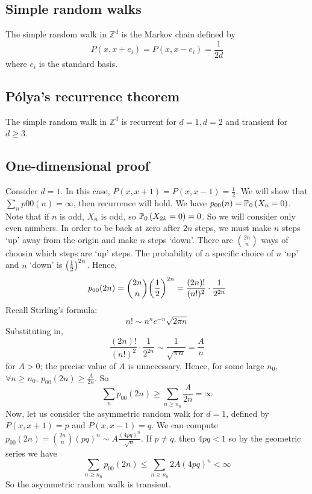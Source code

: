 \subsection{Simple random walks}
\begin{definition}
	The simple random walk in \( \mathbb Z^d \) is the Markov chain defined by
	\[
		P(x,x+e_i) = P(x,x-e_i) = \frac{1}{2d}
	\]
	where \( e_i \) is the standard basis.
\end{definition}

\subsection{P\'olya's recurrence theorem}
\begin{theorem}
	The simple random walk in \( \mathbb Z^d \) is recurrent for \( d = 1, d = 2 \) and transient for \( d \geq 3 \).
\end{theorem}

\subsection{One-dimensional proof}
Consider \( d = 1 \).
In this case, \( P(x,x+1) = P(x,x-1) = \frac{1}{2} \).
We will show that \( \sum_n p{00}(n) = \infty \), then recurrence will hold.
We have \( p_{00}(n) = \mathbb{P}_{0}\left({X_n = 0}\right) \).
Note that if \( n \) is odd, \( X_n \) is odd, so \( \mathbb{P}_{0}\left({X_{2k} = 0}\right) = 0 \).
So we will consider only even numbers.
In order to be back at zero after \( 2n \) steps, we must make \( n \) steps `up' away from the origin and make \( n \) steps `down'.
There are \( \binom{2n}{n} \) ways of choosin which steps are `up' steps.
The probability of a specific choice of \( n \) `up' and \( n \) `down' is \( \qty(\frac{1}{2})^{2n} \).
Hence,
\[
	p_{00}(2n) = \binom{2n}{n} \qty(\frac{1}{2})^{2n} = \frac{(2n)!}{(n!)^2} \cdot \frac{1}{2^{2n}}
\]
Recall Stirling's formula:
\[
	n!
	\sim n^n e^{-n} \sqrt{2 \pi n}
\]
Substituting in,
\[
	\frac{(2n)!}{(n!)^2} \cdot \frac{1}{2^{2n}} \sim \frac{1}{\sqrt{\pi n}} = \frac{A}{n}
\]
for \( A > 0 \); the precise value of \( A \) is unnecessary.
Hence, for some large \( n_0 \), \( \forall n \geq n_0 \), \( p_{00}(2n) \geq \frac{A}{2n} \).
So
\[
	\sum_n p_{00}(2n) \geq \sum_{n \geq n_0} \frac{A}{2n} = \infty
\]
Now, let us consider the asymmetric random walk for \( d = 1 \), defined by \( P(x,x+1) = p \) and \( P(x,x-1) = q \).
We can compute \( p_{00}(2n) = \binom{2n}{n} (pq)^n \sim A \frac{(4pq)^n}{\sqrt{n}} \).
If \( p \neq q \), then \( 4pq < 1 \) so by the geometric series we have
\[
	\sum_{n \geq n_0} p_{00}(2n) \leq \sum_{n \geq n_0} 2A (4pq)^n < \infty
\]
So the asymmetric random walk is transient.

